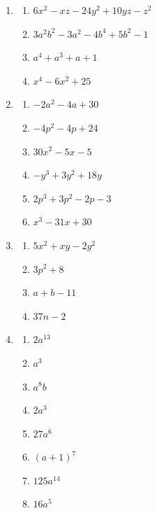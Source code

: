 \begin{enumerate}
    \item
          \begin{enumerate}
              \item \(6x^2-xz-24y^2+10yz-z^2\)
              \item \(3a^2b^2-3a^2-4b^4+5b^2-1\)
              \item \(a^4+a^3+a+1\)
              \item \(x^4-6x^2+25\)
          \end{enumerate}

    \item
          \begin{enumerate}
              \item \(-2a^2-4a+30\)
              \item \(-4p^2-4p+24\)
              \item \(30x^2-5x-5\)
              \item \(-y^3+3y^2+18y\)
              \item \(2p^3+3p^2-2p-3\)
              \item \(x^3-31x+30\)
          \end{enumerate}

    \item
          \begin{enumerate}
              \item \(5x^2+xy-2y^2\)
              \item \(3p^2+8\)
              \item \(a+b-11\)
              \item \(37n-2\)
          \end{enumerate}

    \item
          \begin{enumerate}
              \item \(2a^{13}\)
              \item \(a^3\)
              \item \(a^8b\)
              \item \(2a^3\)
              \item \(27a^6\)
              \item \((a+1)^7\)
              \item \(125a^{14}\)
              \item \(16a^5\)
          \end{enumerate}


\end{enumerate}
